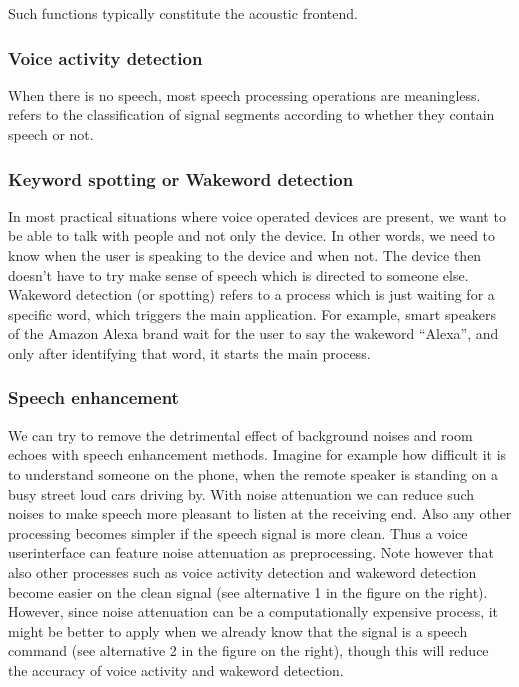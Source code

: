 \documentclass[letterpaper,10pt,english]{jupyterBook}
\begin{document}
\sphinxAtStartPar
Such functions typically constitute the acoustic front\sphinxhyphen{}end.


\subsubsection{Voice activity detection}
\label{\detokenize{Introduction/Applications_and_systems_structures:voice-activity-detection}}
\sphinxAtStartPar
When there is no speech, most speech processing operations are
meaningless. 
refers to the classification of signal segments according to whether
they contain speech or not.


\subsubsection{Keyword spotting or Wake\sphinxhyphen{}word detection}
\label{\detokenize{Introduction/Applications_and_systems_structures:keyword-spotting-or-wake-word-detection}}
\sphinxAtStartPar
In most practical situations where voice operated devices are present,
we want to be able to talk with people and not only the device. In other
words, we need to know when the user is speaking to the device and when
not. The device then doesn’t have to try make sense of speech which is
directed to someone else. Wake\sphinxhyphen{}word detection (or spotting) refers to a
process which is just waiting for a specific word, which triggers the
main application. For example, smart speakers of the Amazon Alexa brand
wait for the user to say the wake\sphinxhyphen{}word “Alexa”, and only after
identifying that word, it starts the main process.


\subsubsection{Speech enhancement}
\label{\detokenize{Introduction/Applications_and_systems_structures:speech-enhancement}}
\sphinxAtStartPar
We can try to remove the detrimental effect of background noises and
room echoes with speech enhancement methods. Imagine for example how
difficult it is to understand someone on the phone, when the remote
speaker is standing on a busy street loud cars driving by. With noise
attenuation we can reduce such noises to make speech more pleasant to
listen at the receiving end. Also any other processing becomes simpler
if the speech signal is more clean. Thus a voice user\sphinxhyphen{}interface can
feature noise attenuation as pre\sphinxhyphen{}processing. Note however that also
other processes such as voice activity detection and wake\sphinxhyphen{}word detection
become easier on the clean signal (see alternative 1 in the figure on
the right). However, since noise attenuation can be a computationally
expensive process, it might be better to apply when we already know that
the signal is a speech command (see alternative 2 in the figure on the
right), though this will reduce the accuracy of voice activity and
wake\sphinxhyphen{}word detection.
\end{document}
